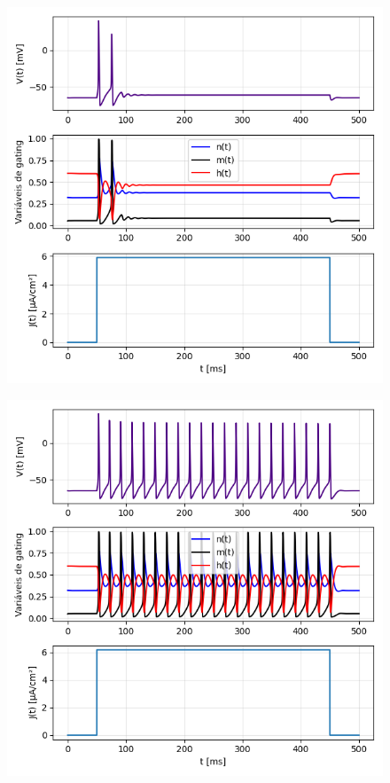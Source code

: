 \documentclass[english,11pt,a4paper]{article}
\begin{document}
\begin{figure}[H]
\begin{minipage}{0.49\textwidth}
			\captionsetup{justification=centering, labelformat=empty}
			\label{}
		\end{minipage}
		\begin{minipage}{0.49\textwidth}
			\centering
			\includegraphics[width=\linewidth]{../figures/ex_4_3.png}
			\captionsetup{justification=centering, labelformat=empty}
			\label{}
		\end{minipage}
		\begin{minipage}{0.49\textwidth}
			\centering
			\includegraphics[width=\linewidth]{../figures/ex_4_4.png}

\end{minipage}
\end{figure}
\end{document}
